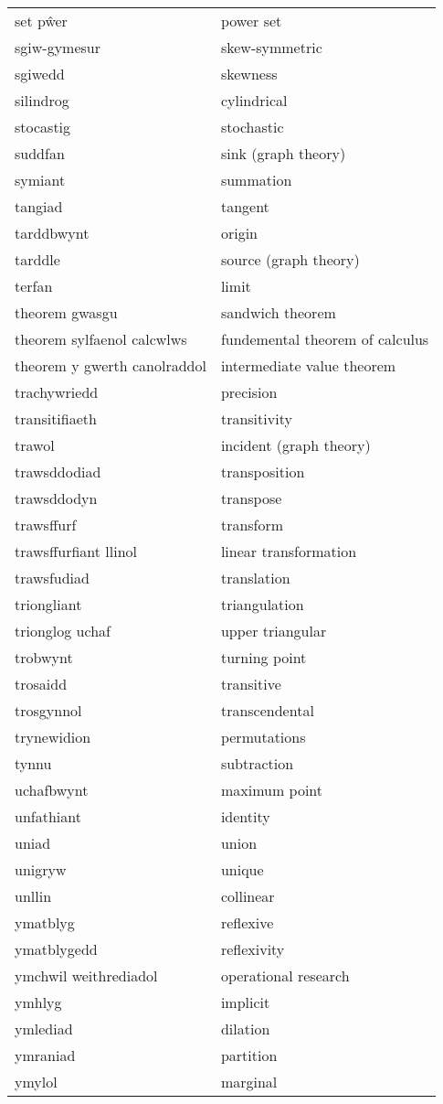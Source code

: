 \begin{supertabular}{p{0.22\textwidth}p{0.22\textwidth}}
set pŵer & power set \\
sgiw-gymesur & skew-symmetric \\
sgiwedd & skewness \\
silindrog & cylindrical \\
stocastig & stochastic \\
suddfan & sink (graph theory) \\
symiant & summation \\
tangiad & tangent \\
tarddbwynt & origin \\
tarddle & source (graph theory) \\
terfan & limit \\
theorem gwasgu & sandwich theorem \\
theorem sylfaenol calcwlws & fundemental theorem of calculus \\
theorem y gwerth canolraddol & intermediate value theorem \\
trachywriedd & precision \\
transitifiaeth & transitivity \\
trawol & incident (graph theory) \\
trawsddodiad & transposition \\
trawsddodyn & transpose \\
trawsffurf & transform \\
trawsffurfiant llinol & linear transformation \\
trawsfudiad & translation \\
triongliant & triangulation \\
trionglog uchaf & upper triangular \\
trobwynt & turning point \\
trosaidd & transitive \\
trosgynnol & transcendental \\
trynewidion & permutations \\
tynnu & subtraction \\
uchafbwynt & maximum point \\
unfathiant & identity \\
uniad & union \\
unigryw & unique \\
unllin & collinear \\
ymatblyg & reflexive \\
ymatblygedd & reflexivity \\
ymchwil weithrediadol & operational research \\
ymhlyg & implicit \\
ymlediad & dilation \\
ymraniad & partition \\
ymylol & marginal \\
\end{supertabular}
